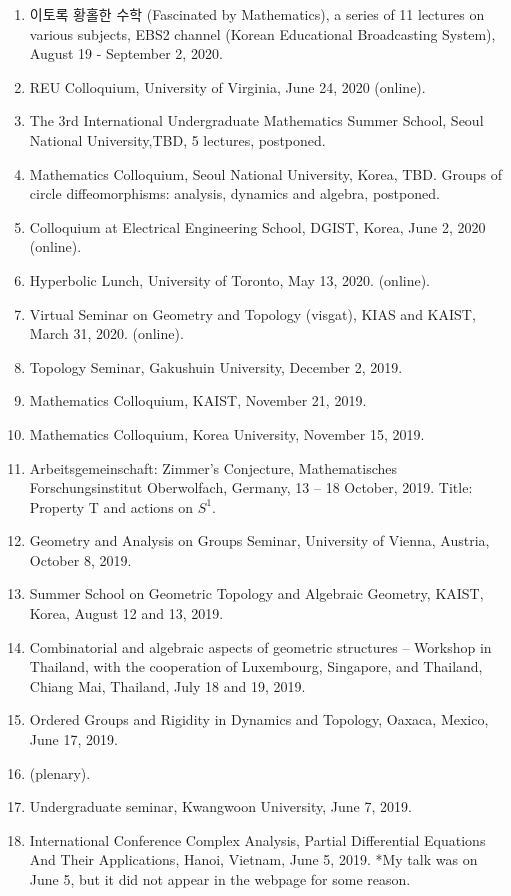 \documentclass[11pt,a4paper]{article}
\begin{document}
\begin{enumerate}[leftmargin=1.5em, label=\arabic*.]
\item 이토록 황홀한 수학 (Fascinated by Mathematics), a series of 11 lectures on various subjects, EBS2 channel (Korean Educational Broadcasting System), August 19 - September 2, 2020.
\item REU Colloquium, University of Virginia, June 24, 2020 (online).
\item The 3rd International Undergraduate Mathematics Summer School, Seoul National University,TBD, 5 lectures, postponed.
\item Mathematics Colloquium, Seoul National University, Korea, TBD. Groups of circle diffeomorphisms: analysis, dynamics and algebra, postponed.
\item Colloquium at Electrical Engineering School, DGIST, Korea, June 2, 2020 (online).
\item Hyperbolic Lunch, University of Toronto, May 13, 2020. (online).
\item Virtual Seminar on Geometry and Topology (visgat), KIAS and KAIST, March 31, 2020. (online).
\item Topology Seminar, Gakushuin University, December 2, 2019.
\item Mathematics Colloquium, KAIST, November 21, 2019.
\item Mathematics Colloquium, Korea University, November 15, 2019.
\item Arbeitsgemeinschaft: Zimmer's Conjecture, Mathematisches Forschungsinstitut Oberwolfach, Germany, 13 -- 18 October, 2019. Title: Property T and actions on $S^1$.
\item Geometry and Analysis on Groups Seminar, University of Vienna, Austria, October 8, 2019.
\item Summer School on Geometric Topology and Algebraic Geometry, KAIST, Korea, August 12 and 13, 2019.
\item Combinatorial and algebraic aspects of geometric structures – Workshop in Thailand, with the cooperation of Luxembourg, Singapore, and Thailand, Chiang Mai, Thailand, July 18 and 19, 2019.
\item Ordered Groups and Rigidity in Dynamics and Topology, Oaxaca, Mexico, June 17, 2019.
\item (plenary).
\item Undergraduate seminar, Kwangwoon University, June 7, 2019.
\item International Conference Complex Analysis, Partial Differential Equations And Their Applications, Hanoi, Vietnam, June 5, 2019. *My talk was on June 5, but it did not appear in the webpage for some reason.

\end{enumerate}
\end{document}
